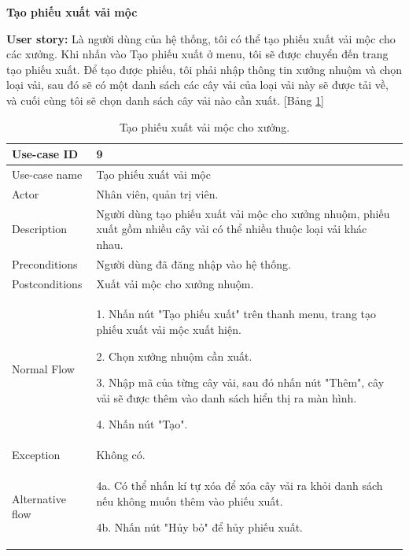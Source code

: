 \textbf{Tạo phiếu xuất vải mộc}\par
\textbf{User story:} Là người dùng của hệ thống, tôi có thể tạo phiếu xuất vải mộc cho các xưởng. Khi nhấn vào Tạo phiếu xuất ở menu, tôi sẽ được chuyển đến trang tạo phiếu xuất. Để tạo được phiếu, tôi phải nhập thông tin xưởng nhuộm và chọn loại vải, sau đó sẽ có một danh sách các cây vải của loại vải này sẽ được tải về, và cuối cùng tôi sẽ chọn danh sách cây vải nào cần xuất. [Bảng \ref{bang9}]
\begin{table}[H]
    \centering
    \begin{tabular}{|m{3cm}|m{10cm}|}
    \hline 
        Use-case ID & 9\\ \hline
        Use-case name & Tạo phiếu xuất vải mộc\\ \hline
        Actor & Nhân viên, quản trị viên.\\ \hline
        Description & Người dùng tạo phiếu xuất vải mộc cho xưởng nhuộm, phiếu xuất gồm nhiều cây vải có thể nhiều thuộc loại vải khác nhau.\\ \hline
        Preconditions & Người dùng đã đăng nhập vào hệ thống.
        \\ \hline
        Postconditions & Xuất vải mộc cho xưởng nhuộm.\\ \hline
        Normal Flow & 
        1. Nhấn nút "Tạo phiếu xuất" trên thanh menu, trang tạo phiếu xuất vải mộc xuất hiện.\par
        2. Chọn xưởng nhuộm cần xuất.\par
        3. Nhập mã của từng cây vải, sau đó nhấn nút "Thêm", cây vải sẽ được thêm vào danh sách hiển thị ra màn hình.\par
        4. Nhấn nút "Tạo".
        \\ \hline
        Exception & Không có.
        \\ \hline
        Alternative flow & 
        4a. Có thể nhấn kí tự xóa để xóa cây vải ra khỏi danh sách nếu không muốn thêm vào phiếu xuất.\par
        4b. Nhấn nút "Hủy bỏ" để hủy phiếu xuất.
        \\ 
    \hline 
    \end{tabular}
    \caption{Tạo phiếu xuất vải mộc cho xưởng.}
    \label{bang9}
\end{table}


